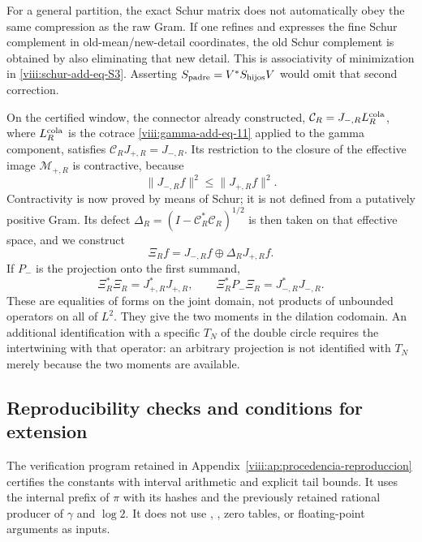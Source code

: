 For a general partition, the exact Schur matrix does not automatically
obey the same compression as the raw Gram. If one refines and expresses the
fine Schur complement in old-mean/new-detail coordinates, the old Schur
complement is obtained by also eliminating that new detail. This is
associativity of minimization in \eqref{viii:schur-add-eq-S3}. Asserting
\(S_{\rm padre}=V^*S_{\rm hijos}V\) would omit that second correction.

On the certified window, the connector already constructed,
\(\mathcal C_R=J_{-,R}L_R^{\rm cola}\), where
\(L_R^{\rm cola}\) is the cotrace
\eqref{viii:gamma-add-eq-11} applied to the gamma component, satisfies
\(\mathcal C_RJ_{+,R}=J_{-,R}\). Its restriction to the closure of the
effective image \(\mathcal M_{+,R}\) is contractive, because
\begin{equation}
\|J_{-,R}f\|^2\leq\|J_{+,R}f\|^2.
\label{viii:schur-add-display-31}
\end{equation}
Contractivity is now proved by means of Schur; it is not defined
from a putatively positive Gram. Its defect
\(\Delta_R=(I-\mathcal C_R^*\mathcal C_R)^{1/2}\) is then taken on that
effective space, and we construct
\begin{equation}
\Xi_Rf=J_{-,R}f\oplus\Delta_RJ_{+,R}f.
\label{viii:schur-add-display-32}
\end{equation}
If \(P_-\) is the projection onto the first summand,
\begin{equation}
\Xi_R^*\Xi_R=J_{+,R}^*J_{+,R},\qquad
\Xi_R^*P_-\Xi_R=J_{-,R}^*J_{-,R}.
\label{viii:schur-add-display-33}
\end{equation}
These are equalities of forms on the joint domain, not products of
unbounded operators on all of \(L^2\). They give the two moments in
the dilation codomain. An additional identification with a
specific \(T_N\) of the double circle requires the intertwining
with that operator: an arbitrary projection is not identified with
\(T_N\) merely because the two moments are available.

\subsection{Reproducibility checks and conditions for extension}
\label{viii:schur-add-sub-411}

The verification program retained in
Appendix~\ref{viii:ap:procedencia-reproduccion} certifies the constants with interval arithmetic and explicit
tail bounds. It uses the internal prefix of \(\pi\) with its hashes and the
previously retained rational producer of \(\gamma\) and \(\log2\). It does not use \texttt{},
\texttt{}, zero tables, or floating-point arguments as inputs.

